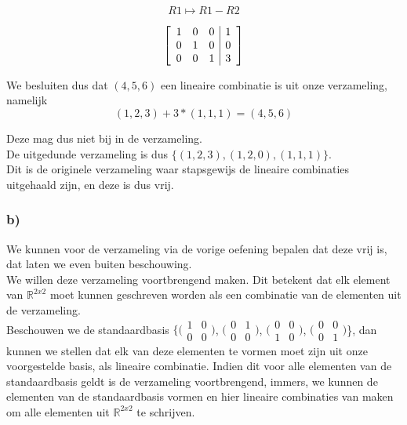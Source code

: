 \documentclass[lineaire_algebra_oplossingen.tex]{subfiles}
\begin{document}
\[R1 \mapsto R1 - R2\]

\[
\left[
\begin{array}{c c c | c}
1 & 0 & 0 & 1\\
0 & 1 & 0 & 0\\
0 & 0 & 1 & 3
\end{array}
\right]
\]

We besluiten dus dat $(4,5,6)$ een lineaire combinatie is uit onze verzameling, namelijk\\

\[
(1,2,3) + 3 * (1,1,1) = (4,5,6)
\]

Deze mag dus niet bij in de verzameling.\\

De uitgedunde verzameling is dus $\{(1,2,3), (1,2,0), (1,1,1)\}$.\\

Dit is de originele verzameling waar stapsgewijs de lineaire combinaties uitgehaald zijn, en deze is dus vrij.

\subsubsection*{b)}

We kunnen voor de verzameling via de vorige oefening bepalen dat deze vrij is, dat laten we even buiten beschouwing.\\

We willen deze verzameling voortbrengend maken. Dit betekent dat elk element van $\mathbb{R}^{2x2}$ moet kunnen geschreven worden als een combinatie van de elementen uit de verzameling.\\

Beschouwen we de standaardbasis $\{\bigl(
\begin{smallmatrix}
1&0\\ 0&0
\end{smallmatrix}
\bigr)$,
$\bigl(
\begin{smallmatrix}
0&1\\ 0&0
\end{smallmatrix}
\bigr)$,
$\bigl(
\begin{smallmatrix}
0&0\\ 1&0
\end{smallmatrix}
\bigr)$,
$\bigl(
\begin{smallmatrix}
0&0\\ 0&1
\end{smallmatrix}
\bigr)$\}, dan kunnen we stellen dat elk van deze elementen te vormen moet zijn uit onze voorgestelde basis, als lineaire combinatie. Indien dit voor alle elementen van de standaardbasis geldt is de verzameling voortbrengend, immers, we kunnen de elementen van de standaardbasis vormen en hier lineaire combinaties van maken om alle elementen uit $\mathbb{R}^{2x2}$ te schrijven.\\
\end{document}
